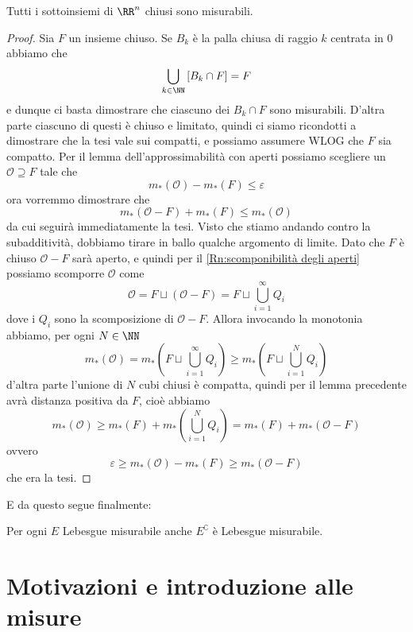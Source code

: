 \documentclass[11pt]{scrartcl}
\begin{document}
	\begin{lemma}
		Tutti i sottoinsiemi di $\RR^n$ chiusi sono misurabili.
	\end{lemma}
	\begin{proof}
		Sia $F$ un insieme chiuso. Se $B_k$ è la palla chiusa di raggio $k$ centrata in $0$ abbiamo che 
		$$\bigcup_{k\in\NN}\left[B_k\cap F\right]=F$$
		e dunque ci basta dimostrare che ciascuno dei $B_k\cap F$ sono misurabili. D'altra parte ciascuno di questi è chiuso e limitato, quindi ci siamo ricondotti a dimostrare che la tesi vale sui compatti, e possiamo assumere WLOG che $F$ sia compatto. Per il lemma dell'approssimabilità con aperti possiamo scegliere un $\mathcal{O}\supseteq F$ tale che
		$$m_*(\mathcal{O})-m_*(F)\le \varepsilon$$
		ora vorremmo dimostrare che
		$$m_*(\mathcal{O}-F)+m_*(F)\le m_*(\mathcal{O})$$
		da cui seguirà immediatamente la tesi. Visto che stiamo andando contro la subadditività, dobbiamo tirare in ballo qualche argomento di limite. Dato che $F$ è chiuso $\mathcal{O}-F$ sarà aperto, e quindi per il \ref{Rn:scomponibilità degli aperti} possiamo scomporre $\mathcal{O}$ come
		$$\mathcal{O}=F\sqcup \left(\mathcal{O}-F\right)=F\sqcup\bigcup_{i=1}^\infty Q_i$$
		dove i $Q_i$ sono la scomposizione di $\mathcal{O}-F$. Allora invocando la monotonia abbiamo, per ogni $N\in \NN$
		$$m_*(\mathcal{O})=m_*\left(F\sqcup \bigcup_{i=1}^\infty Q_i\right)\ge m_*\left(F\sqcup \bigcup_{i=1}^N Q_i\right)$$
		d'altra parte l'unione di $N$ cubi chiusi è compatta, quindi per il lemma precedente avrà distanza positiva da $F$, cioè abbiamo
		$$m_*(\mathcal{O})\ge m_*\left(F\right)+m_*\left(\bigcup_{i=1}^N Q_i\right)=m_*(F)+m_*(\mathcal{O}-F)$$
		ovvero 
		$$\varepsilon \ge m_*(\mathcal{O})-m_*(F)\ge m_*(\mathcal{O}-F)$$
		che era la tesi.
	\end{proof}
	E da questo segue finalmente:
	\begin{corollary}
		Per ogni $E$ Lebesgue misurabile anche $E^\complement$ è Lebesgue misurabile.
	\end{corollary}
	
	\newpage
	
	\section{Motivazioni e introduzione alle misure}
	
\end{document}
